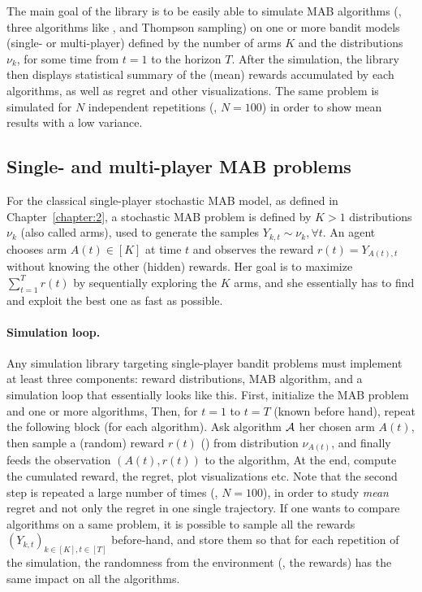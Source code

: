 The main goal of the library is to be easily able to simulate MAB algorithms (\eg, three algorithms like \UCB, \klUCB{} and Thompson sampling) on one or more bandit models (single- or multi-player) defined by the number of arms $K$ and the distributions $\nu_k$, for some time from $t=1$ to the horizon $T$.
After the simulation, the library then displays statistical summary of the (mean) rewards accumulated by each algorithms, as well as regret and other visualizations.
The same problem is simulated for $N$ independent repetitions (\eg, $N=100$) in order to show mean results with a low variance.


\subsection{Single- and multi-player MAB problems}

For the classical single-player stochastic MAB model, as defined in Chapter~\ref{chapter:2},
a stochastic MAB problem is defined by $K>1$ distributions $\nu_k$ (also called arms),
used to generate the \iid{} samples $Y_{k,t} \sim \nu_k, \forall t$.
An agent chooses arm $A(t)\in[K]$ at time $t$ and observes the reward $r(t) = Y_{A(t),t}$ without knowing the other (hidden) rewards.
Her goal is to maximize $\sum_{t=1}^T r(t)$ by sequentially exploring the $K$ arms, and she essentially has to find and exploit the best one as fast as possible.

\paragraph{Simulation loop.}
%
Any simulation library targeting single-player bandit problems must implement at least three components:
reward distributions, MAB algorithm, and a simulation loop that essentially looks like this.
    First, initialize the MAB problem and one or more algorithms,
    Then, for $t=1$ to $t=T$ (known before hand), repeat the following block (for each algorithm). Ask algorithm $\mathcal{A}$ her chosen arm $A(t)$, then sample a (random) reward $r(t)$ (\iid) from distribution $\nu_{A(t)}$, and finally feeds the observation $(A(t), r(t))$ to the algorithm,
    At the end, compute the cumulated reward, the regret, plot visualizations etc.
%
Note that the second step is repeated a large number of times (\eg, $N=100$), in order to study \emph{mean} regret and not only the regret in one single trajectory.
If one wants to compare algorithms on a same problem, it is possible to sample all the rewards $(Y_{k,t})_{k\in[K], t\in[T]}$ before-hand, and store them so that for each repetition of the simulation, the randomness from the environment (\ie, the rewards) has the same impact on all the algorithms.


